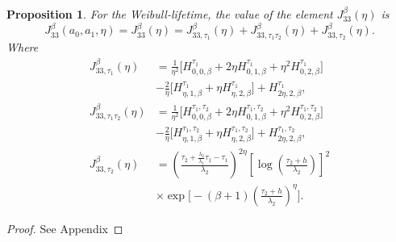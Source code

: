 \documentclass{article}
\newtheorem{proposition}[theorem]{Proposition}
\begin{document}
\begin{proposition}\label{thm:asympeta}
For the Weibull-lifetime, the value of the element $J_{33}^{\beta}(\eta)$ is
\begin{equation*}
J_{33}^{\beta}(a_0,a_1,\eta) = J_{33}^{\beta}(\eta)=J_{33,\tau_1}^{\beta}(\eta)+J_{33,\tau_1\tau_2}^{\beta}(\eta)+J_{33,\tau_2}^{\beta}(\eta).
\end{equation*}
Where
\begin{equation}
\begin{aligned}
J_{33,\tau_1}^{\beta}(\eta)
&=\frac{1}{\eta^2}
\Big[
H_{0,0,\beta}^{\tau_1}
+2\eta H_{0,1,\beta}^{\tau_1}
+\eta^2 H_{0,2,\beta}^{\tau_1}
\Big]
\\
&
-\frac{2}{\eta}
\Big[
H_{\eta,1,\beta}^{\tau_1}
+\eta H_{\eta,2,\beta}^{\tau_1}
\Big]
+H_{2\eta,2,\beta}^{\tau_1},
\\[0.6em]
J_{33,\tau_1\tau_2}^{\beta}(\eta)
&=\frac{1}{\eta^2}
\Big[
H_{0,0,\beta}^{\tau_1,\tau_2}
+2\eta H_{0,1,\beta}^{\tau_1,\tau_2}
+\eta^2 H_{0,2,\beta}^{\tau_1,\tau_2}
\Big]
\\
&
-\frac{2}{\eta}
\Big[
H_{\eta,1,\beta}^{\tau_1,\tau_2}
+\eta H_{\eta,2,\beta}^{\tau_1,\tau_2}
\Big]
+H_{2\eta,2,\beta}^{\tau_1,\tau_2},
\\
J_{33,\tau_2}^{\beta}(\eta)
&=
\left(
\frac{\tau_2+\frac{\lambda_2}{\lambda_1}\tau_1-\tau_1}{\lambda_2}
\right)^{2\eta}
\left[
\log\!\left(
\frac{\tau_2+h}{\lambda_2}
\right)
\right]^2
\\
&\times
\exp\!\Bigg[
-(\beta+1)
\left(
\frac{\tau_2+h}{\lambda_2}
\right)^{\eta}
\Bigg].
\end{aligned}  \nonumber
\end{equation}

\end{proposition}
\begin{proof}
See Appendix
\end{proof}
\end{document}
